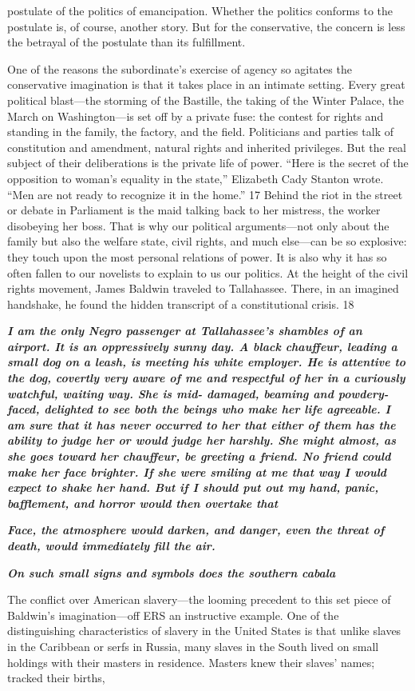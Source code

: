 postulate of the politics of emancipation. Whether the politics conforms to the postulate is, of course, another story. But for the conservative, the concern is less the betrayal of the postulate than its fulfillment.{\par} One of the reasons the subordinate’s exercise of agency so agitates the conservative imagination is that it takes place in an intimate setting. Every great political blast—the storming of the Bastille, the taking of the Winter Palace, the March on Washington—is set off by a private fuse: the contest for rights and standing in the family, the factory, and the field. Politicians and parties talk of constitution and amendment, natural rights and inherited privileges. But the real subject of their deliberations is the private life of power. “Here is the secret of the opposition to woman’s equality in the state,” Elizabeth Cady Stanton wrote. “Men are not ready to recognize it in the home.” {\color{blue} 17 } Behind the riot in the street or debate in Parliament is the maid talking back to her mistress, the worker disobeying her boss. That is why our political arguments—not only about the family but also the welfare state, civil rights, and much else—can be so explosive: they touch upon the most personal relations of power. It is also why it has so often fallen to our novelists to explain to us our politics. At the height of the civil rights movement, James Baldwin traveled to Tallahassee. There, in an imagined handshake, he found the hidden transcript of a constitutional crisis. 18{\par} {\textbf{\textit{I am the only Negro passenger at Tallahassee’s shambles of an airport. It is an oppressively sunny day. A black chauffeur, leading a small dog on a leash, is meeting his white employer. He is attentive to the dog, covertly very aware of me and respectful of her in a curiously watchful, waiting way. She is mid- damaged, beaming and powdery-faced, delighted to see both the beings who make her life agreeable. I am sure that it has never occurred to her that either of them has the ability to judge her or would judge her harshly. She might almost, as she goes toward her chauffeur, be greeting a friend. No friend could make her face brighter. If she were smiling at me that way I would expect to shake her hand. But if I should put out my hand, panic, bafflement, and horror would then overtake that} } }{\par} {\par} {\textbf{\textit{Face, the atmosphere would darken, and danger, even the threat of death, would immediately fill the air.} } }{\par} {\par} {\textbf{\textit{On such small signs and symbols does the southern cabala} } }{\par} The conflict over American slavery—the looming precedent to this set piece of Baldwin’s imagination—off ERS an instructive example. One of the distinguishing characteristics of slavery in the United States is that unlike slaves in the Caribbean or serfs in Russia, many slaves in the South lived on small holdings with their masters in residence. Masters knew their slaves’ names; tracked their births, 